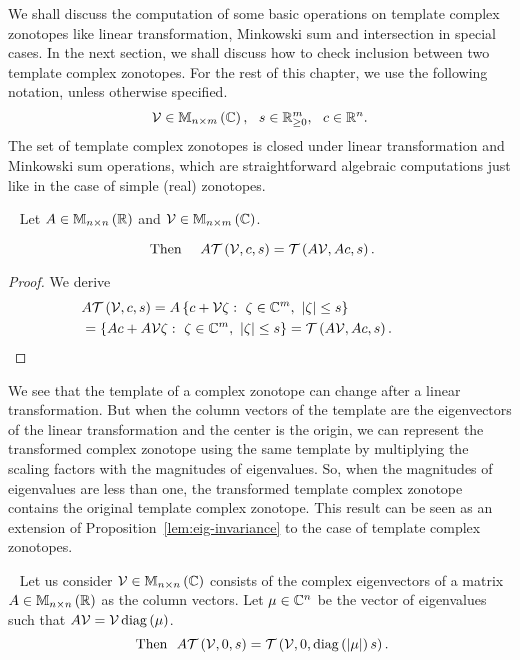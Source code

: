 We shall discuss the computation of some basic operations on template
complex zonotopes like linear transformation, Minkowski sum and
intersection in special cases.  In the next section, we shall discuss
how to check inclusion between two template complex zonotopes.  For
the rest of this chapter, we use the following notation, unless
otherwise specified.
%
\begin{align*}
\mathcal{V}\in\mathbb{M}_{n\times m}\left(\mathbb{C}\right),~~s\in\mathbb{R}^m_{\geq 0},~~c\in\mathbb{R}^n.
\end{align*}
%
The set of template complex zonotopes is closed under linear transformation and
{Minkowski sum} operations, which are straightforward algebraic
computations just like in the case of simple (real) zonotopes.
%
\begin{lemma}~\label{lem:lin-transform}
Let $A\in\mathbb{M}_{n\times n}\left(\mathbb{R}\right)$ and $\mathcal{V}\in\mathbb{M}_{n\times m}\left(\mathbb{C}\right)$.

%
\begin{equation*}~\label{eqn:lin-transform}
\text{Then}~~~~A\mathit{\operatorname{\mathcal{T}}}\left(\mathcal{V},c,s\right)=\mathit{\operatorname{\mathcal{T}}}\left(A\mathcal{V},Ac,s\right).
\end{equation*}
%
\end{lemma}
%
\begin{proof}
  We derive
  \begin{align*}
&
    A\mathit{\operatorname{\mathcal{T}}}\left(\mathcal{V},c,s\right)=A\left\{c+\mathcal{V}\zeta:~\zeta\in\mathbb{C}^m,~\left|\zeta\right|\leq
    s\right\}\\
    & =\left\{Ac+A\mathcal{V}\zeta:~\zeta\in\mathbb{C}^m,~\left|\zeta\right|\leq
    s\right\}=\mathit{\operatorname{\mathcal{T}}}\left(A\mathcal{V},Ac,s\right).~\hspace{3em}\qedhere
  \end{align*}
\end{proof}
%
We see that the template of a complex zonotope can change after a
linear transformation.  But when the column vectors of the template
are the eigenvectors of the linear transformation and the center is
the origin, we can represent the transformed complex zonotope using
the same template by multiplying the scaling factors with the
magnitudes of eigenvalues.  So, when the magnitudes of eigenvalues are
less than one, the transformed template complex zonotope contains the
original template complex zonotope.  This result can be seen as an
extension of Proposition~\ref{lem:eig-invariance} to the case of
template complex zonotopes.
%
\begin{lemma}~\label{lem:eig-scaling}
Let us consider $\mathcal{V}\in\mathbb{M}_{n\times n}\left(\mathbb{C}\right)$ consists of the complex
eigenvectors of a matrix $A\in\mathbb{M}_{n\times n}\left(\mathbb{R}\right)$ as the column vectors.
Let $\mu\in\mathbb{C}^n$ be the vector of eigenvalues such that
$A\mathcal{V}=\mathcal{V}\operatorname{diag}\left(\mu\right)$.
%
\begin{equation}~\label{eqn:eigen-scaling}
\text{Then}~~A\mathit{\operatorname{\mathcal{T}}}\left(\mathcal{V},0,s\right)=\mathit{\operatorname{\mathcal{T}}}\left(\mathcal{V},0,\operatorname{diag}\left(\left|\mu\right|\right)s\right).
\end{equation}
%
\end{lemma}
